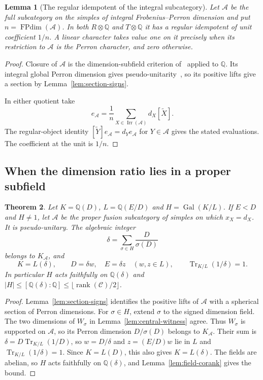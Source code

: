 \documentclass[11pt,reqno]{amsart}
\newtheorem{theorem}{Theorem}[section]
\newtheorem{lemma}[theorem]{Lemma}
\theoremstyle{remark}\newtheorem{remark}[theorem]{Remark}
\numberwithin{equation}{section}
\begin{document}
\begin{lemma}[The regular idempotent of the integral subcategory]\label{lem:integral-regular}
Let $\mathcal A$ be the full subcategory on the simples of integral
Frobenius--Perron dimension and put $n=\operatorname{FPdim}(\mathcal A)$.
In both $R\otimes\mathbb Q$ and $T\otimes\mathbb Q$ it has a regular
idempotent of unit coefficient $1/n$. A linear character takes value
one on it precisely when its restriction to $\mathcal A$ is the
Perron character, and zero otherwise.
\end{lemma}
\begin{proof}
Closure of $\mathcal A$ is the dimension-subfield criterion
of~\cite[\S1]{GSFields} applied to $\mathbb Q$. Its integral global
Perron dimension gives pseudo-unitarity~\cite[Propositions~8.23--8.24]{ENO},
so its positive lifts give a section by Lemma~\ref{lem:section-signs}.

In either quotient take
\[
 e_{\mathcal A}=\frac1n\sum_{X\in\operatorname{Irr}(\mathcal A)}
 d_X[\widetilde X].
\]
The regular-object identity $[\widetilde Y] e_{\mathcal A}=
d_Y e_{\mathcal A}$ for $Y\in\mathcal A$ gives the stated
evaluations. The coefficient at the unit is $1/n$.
\end{proof}

\subsection{When the dimension ratio lies in a proper subfield}
\begin{theorem}\label{thm:proper-ratio}
Let $K=\mathbb Q(D)$, $L=\mathbb Q(E/D)$ and $H=\operatorname{Gal}(K/L)$.
If $E<D$ and $H\ne1$, let $\mathcal A$ be the proper fusion subcategory
of simples on which $x_X=d_X$. It is pseudo-unitary. The algebraic integer
\[
       \delta=\sum_{\sigma\in H}\frac D{\sigma(D)}
\]
belongs to $K_{\mathcal A}$, and
\[
    K=L(\delta),\qquad D=\delta w,\quad E=\delta z\quad(w,z\in L),
    \qquad \operatorname{Tr}_{K/L}(1/\delta)=1 .
\]
In particular $H$ acts faithfully on $\mathbb Q(\delta)$ and
$|H|\le[\mathbb Q(\delta):\mathbb Q]\le\lfloor\operatorname{rank}(\mathcal C)/2\rfloor$.
\end{theorem}
\begin{proof}
Lemma~\ref{lem:section-signs} identifies the positive lifts of
$\mathcal A$ with a spherical section of Perron dimensions.
For $\sigma\in H$, extend $\sigma$ to the signed dimension field.
The two dimensions of $W_\sigma$ in Lemma~\ref{lem:central-witness}
agree. Thus $W_\sigma$ is supported on $\mathcal A$, so its Perron
dimension $D/\sigma(D)$ belongs to $K_{\mathcal A}$. Their sum is
$\delta=D\operatorname{Tr}_{K/L}(1/D)$, so $w=D/\delta$ and
$z=(E/D)w$ lie in $L$ and $\operatorname{Tr}_{K/L}(1/\delta)=1$.
Since $K=L(D)$, this also gives $K=L(\delta)$. The fields are
abelian, so $H$ acts faithfully on $\mathbb Q(\delta)$, and
Lemma~\ref{lem:field-corank} gives the bound.
\end{proof}
\end{document}
